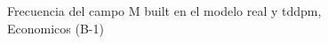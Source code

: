 \begin{figure}[H]
    \centering
    
    \caption{Frecuencia del campo M built en el modelo real y tddpm, Economicos (B-1)}
    \label{frecuency-M Built-tddpm_mlp}
\end{figure}